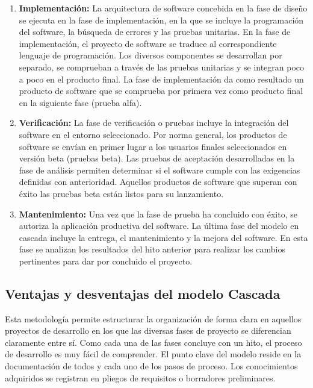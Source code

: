 \begin{enumerate}
    \item \textbf{Implementación:} La arquitectura de software concebida en la fase de diseño se ejecuta en la fase de implementación, en la que se incluye la programación del software, la búsqueda de errores y las pruebas unitarias. En la fase de implementación, el proyecto de software se traduce al correspondiente lenguaje de programación. Los diversos componentes se desarrollan por separado, se comprueban a través de las pruebas unitarias y se integran poco a poco en el producto final. La fase de implementación da como resultado un producto de software que se comprueba por primera vez como producto final en la siguiente fase (prueba alfa).\\

    \item \textbf{Verificación:} La fase de verificación o pruebas incluye la integración del software en el entorno seleccionado. Por norma general, los productos de software se envían en primer lugar a los usuarios finales seleccionados en versión beta (pruebas beta). Las pruebas de aceptación desarrolladas en la fase de análisis permiten determinar si el software cumple con las exigencias definidas con anterioridad. Aquellos productos de software que superan con éxito las pruebas beta están listos para su lanzamiento.\\
    \item \textbf{Mantenimiento:} Una vez que la fase de prueba ha concluido con éxito, se autoriza la aplicación productiva del software. La última fase del modelo en cascada incluye la entrega, el mantenimiento y la mejora del software. En esta fase se analizan los resultados del hito anterior para realizar los cambios pertinentes para dar por concluido el proyecto.\\

\end{enumerate}

\subsection{Ventajas y desventajas del modelo Cascada}
Esta metodología permite estructurar la organización de forma clara en aquellos proyectos de desarrollo en los que las diversas fases de proyecto se diferencian claramente entre sí. Como cada una de las fases concluye con un hito, el proceso de desarrollo es muy fácil de comprender. El punto clave del modelo reside en la documentación de todos y cada uno de los pasos de proceso. Los conocimientos adquiridos se registran en pliegos de requisitos o borradores preliminares.\\

